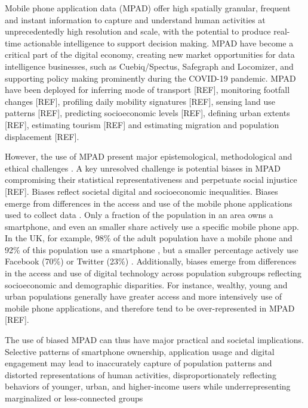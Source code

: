 \documentclass[]{rsos}%
\begin{document}
Mobile phone application data (MPAD) offer high spatially granular,
frequent and instant information to capture and understand human
activities at unprecedentedly high resolution and scale, with the
potential to produce real-time actionable intelligence to support
decision making. MPAD have become a critical part of the digital
economy, creating new market opportunities for data intelligence
businesses, such as Cuebiq/Spectus, Safegraph and Locomizer, and
supporting policy making prominently during the COVID-19 pandemic. MPAD
have been deployed for inferring mode of transport {[}REF{]}, monitoring
footfall changes {[}REF{]}, profiling daily mobility signatures {[}REF{]},
sensing land use patterns {[}REF{]}, predicting socioeconomic levels {[}REF{]},
defining urban extents {[}REF{]}, estimating tourism {[}REF{]} and estimating
migration and population displacement {[}REF{]}.

However, the use of MPAD present major epistemological, methodological
and ethical challenges \citep{rowe23-bigdata}. A key unresolved challenge is
potential biases in MPAD compromising their statistical
representativeness and perpetuate social injustice {[}REF{]}. Biases reflect
societal digital and socioeconomic inequalities. Biases emerge from
differences in the access and use of the mobile phone applications used
to collect data \citep{wesolowski13-biases}. Only a fraction of the
population in an area owns a smartphone, and even an smaller share
actively use a specific mobile phone app. In the UK, for example, 98\% of
the adult population have a mobile phone and 92\% of this population use
a smartphone \citep{ofcom23}, but a smaller percentage actively use Facebook
(70\%) or Twitter (23\%) \citep{statista24}. Additionally, biases emerge from
differences in the access and use of digital technology across
population subgroups reflecting socioeconomic and demographic
disparities. For instance, wealthy, young and urban populations
generally have greater access and more intensively use of mobile phone
applications, and therefore tend to be over-represented in MPAD {[}REF{]}.

The use of biased MPAD can thus have major practical and societal
implications. Selective patterns of smartphone ownership, application
usage and digital engagement may lead to inaccurately capture of
population patterns and distorted representations of human activities,
disproportionately reflecting behaviors of younger, urban, and
higher-income users while underrepresenting marginalized or
less-connected groups
\end{document}
